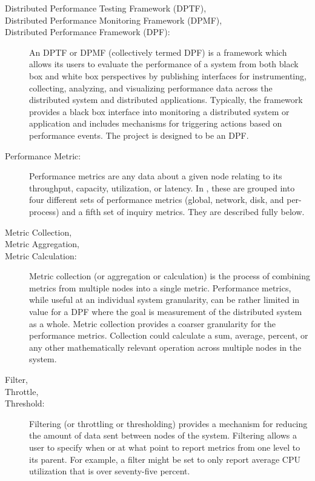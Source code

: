 \begin{description}

\item[Distributed Performance Testing Framework (DPTF),]
\item[Distributed Performance Monitoring Framework (DPMF),]
\item[Distributed Performance Framework (DPF):]

An DPTF or DPMF (collectively termed DPF) is a framework which allows its users to evaluate the performance of a system
from both black box and white box perspectives by publishing interfaces for instrumenting, collecting, analyzing, and
visualizing performance data across the distributed system and distributed applications. Typically, the framework
provides a black box interface into monitoring a distributed system or application and includes mechanisms for
triggering actions based on performance events. The \dcamp project is designed to be an DPF. 

\item[Performance Metric:]
Performance metrics are any data about a given node relating to its throughput, capacity, utilization, or latency. In
\dcamp, these are grouped into four different sets of performance metrics (global, network, disk, and per-process) and a
fifth set of inquiry metrics. They are described fully below. 

\item[Metric Collection,]
\item[Metric Aggregation,]
\item[Metric Calculation:]
Metric collection (or aggregation or calculation) is the process of combining metrics from multiple nodes into a single
metric. Performance metrics, while useful at an individual system granularity, can be rather limited in value for a DPF
where the goal is measurement of the distributed system as a whole. Metric collection provides a coarser granularity
for the performance metrics. Collection could calculate a sum, average, percent, or any other mathematically relevant
operation across multiple nodes in the system. 

\item[Filter,]
\item[Throttle,]
\item[Threshold:]
Filtering (or throttling or thresholding) provides a mechanism for reducing the amount of data sent between nodes of the
system. Filtering allows a user to specify when or at what point to report metrics from one level to its parent. For
example, a filter might be set to only report average CPU utilization that is over seventy-five percent. 


\end{description}
